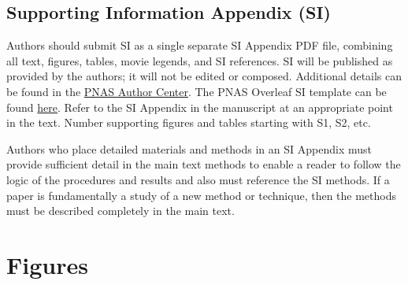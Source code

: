 \documentclass[9pt,twocolumn,twoside]{pnas-new}
\begin{document}

\showacknow{} %


\bibsplit[10]



\clearpage

\subsection*{Supporting Information Appendix (SI)}

Authors should submit SI as a single separate SI Appendix PDF file, combining all text, figures, tables, movie legends, and SI references. SI will be published as provided by the authors; it will not be edited or composed. Additional details can be found in the \href{https://www.pnas.org/authors/submitting-your-manuscript#manuscript-formatting-guidelines}{PNAS Author Center}. The PNAS Overleaf SI template can be found \href{https://www.overleaf.com/latex/templates/pnas-template-for-supplementary-information/wqfsfqwyjtsd}{here}. Refer to the SI Appendix in the manuscript at an appropriate point in the text. Number supporting figures and tables starting with S1, S2, etc.

Authors who place detailed materials and methods in an SI Appendix must provide sufficient detail in the main text methods to enable a reader to follow the logic of the procedures and results and also must reference the SI methods. If a paper is fundamentally a study of a new method or technique, then the methods must be described completely in the main text.



\section*{Figures}
\end{document}
